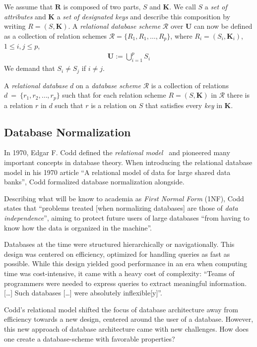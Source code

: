 We assume that \( \boldsymbol{R}\) is composed of two parts, \(S\) and \(\boldsymbol{K}\). We call \(S\) a \emph{set of attributes} and \(\boldsymbol{K}\) a \emph{set of designated keys} and describe this composition by writing \(R = (S, \boldsymbol{K})\).
A \emph{relational database scheme} \( \mathcal{R} \) over \( \boldsymbol{U} \) can now be defined as a collection of relation schemes \( \mathcal{R} = \{R_1, R_1, \dots, R_p\} \), where \(R_i = (S_i, \boldsymbol{K}_i)\), \(1 \leq i, j \leq p\),
\begin{align*}
    \boldsymbol{U} := \bigcup^{p}_{i=1} S_i
\end{align*}
We demand that \(S_i \neq S_j\) if \(i \neq j\).

A \emph{relational database} \( d \) on a \emph{database scheme} \( \mathcal{R} \) is a collection of relations \( d~=~\{r_1, r_2, \dots, r_p \} \) such that for each relation scheme \(R = (S, \boldsymbol{K}) \) in \( \mathcal{R} \) there is a relation \(r\) in \(d\) such that \(r\) is a relation on \(S\) that satisfies every \emph{key} in \(\boldsymbol{K}\).~\cite[p.~94]{MAI83}


\subsection{Database Normalization}
In 1970, Edgar F. Codd defined the \emph{relational model}~\cite{COD70} and pioneered many important concepts in database theory.
When introducing the relational database model in his 1970 article ``A relational model of data for large shared data banks'', Codd formalized database normalization alongside.~\cite{COD70}

Describing what will be know to academia as \emph{First Normal Form} (1NF), Codd states that ``problems treated [when normalizing databases] are those of \emph{data independence}'', aiming to protect future users of large databases ``from having to know how the data is organized in the machine''.~\cite[p.~1]{COD70}

Databases at the time were structured hierarchically or navigationally.
This design was centered on efficiency, optimized for handling queries as fast as possible.
While this design yielded good performance in an era when computing time was cost-intensive, it came with a heavy cost of complexity:
``Teams of programmers were needed to express queries to extract meaningful information. [\dots] Such databases [\dots] were absolutely inflexible[y]''.~\cite{IBM03}

Codd's relational model shifted the focus of database architecture away from efficiency towards a new design, centered around the user of a database.
However, this new approach of database architecture came with new challenges.
How does one create a database-scheme with favorable properties?

